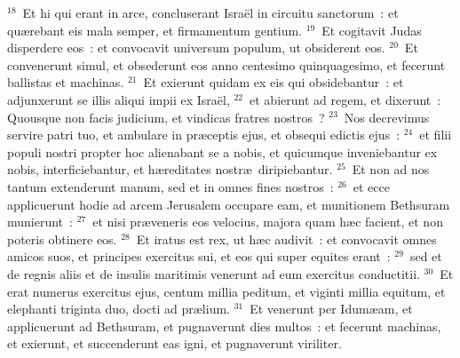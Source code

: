 ${}^{18}$~Et hi qui erant in arce, concluserant Isra\"el in circuitu sanctorum~: et qu\ae rebant eis mala semper, et firmamentum gentium.
${}^{19}$~Et cogitavit Judas disperdere eos~: et convocavit universum populum, ut obsiderent eos.
${}^{20}$~Et convenerunt simul, et obsederunt eos anno centesimo quinquagesimo, et fecerunt ballistas et machinas.
${}^{21}$~Et exierunt quidam ex eis qui obsidebantur~: et adjunxerunt se illis aliqui impii ex Isra\"el,
${}^{22}$~et abierunt ad regem, et dixerunt~: Quousque non facis judicium, et vindicas fratres nostros~?
${}^{23}$~Nos decrevimus servire patri tuo, et ambulare in pr\ae ceptis ejus, et obsequi edictis ejus~:
${}^{24}$~et filii populi nostri propter hoc alienabant se a nobis, et quicumque inveniebantur ex nobis, interficiebantur, et h\ae reditates nostr\ae\ diripiebantur.
${}^{25}$~Et non ad nos tantum extenderunt manum, sed et in omnes fines nostros~:
${}^{26}$~et ecce applicuerunt hodie ad arcem Jerusalem occupare eam, et munitionem Bethsuram munierunt~:
${}^{27}$~et nisi pr\ae veneris eos velocius, majora quam h\ae c facient, et non poteris obtinere eos.
${}^{28}$~Et iratus est rex, ut h\ae c audivit~: et convocavit omnes amicos suos, et principes exercitus sui, et eos qui super equites erant~:
${}^{29}$~sed et de regnis aliis et de insulis maritimis venerunt ad eum exercitus conductitii.
${}^{30}$~Et erat numerus exercitus ejus, centum millia peditum, et viginti millia equitum, et elephanti triginta duo, docti ad pr\ae lium.
${}^{31}$~Et venerunt per Idum\ae am, et applicuerunt ad Bethsuram, et pugnaverunt dies multos~: et fecerunt machinas, et exierunt, et succenderunt eas igni, et pugnaverunt viriliter.


